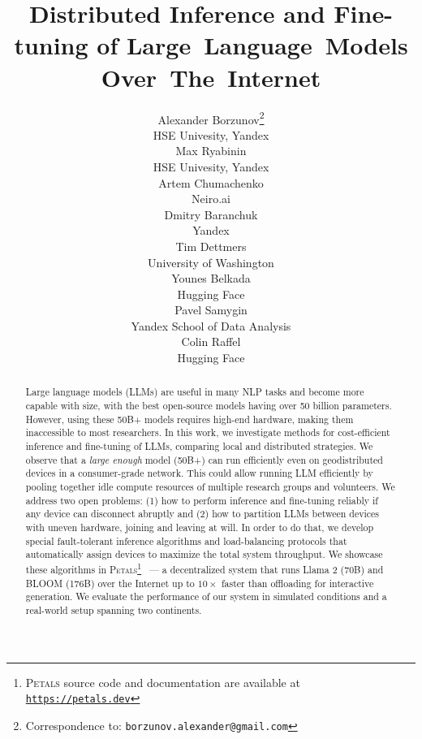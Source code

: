 \documentclass{article}
\title{Distributed Inference and Fine-tuning of Large~Language~Models Over~The~Internet}
\author{%
  Alexander Borzunov\thanks{Correspondence to: \texttt{borzunov.alexander@gmail.com}} \\
  HSE Univesity, Yandex \\
  \And
  Max Ryabinin \\
  HSE Univesity, Yandex \\
  \And
  Artem Chumachenko \\
  Neiro.ai \\
  \AND
  Dmitry Baranchuk \\
  Yandex \\
  \And
  Tim Dettmers \\
  University of Washington \\
  \And
  Younes Belkada \\
  Hugging Face \\
  \AND
  Pavel Samygin \\
  Yandex School of Data Analysis \\
  \And
  Colin Raffel \\
  Hugging Face
}
\begin{document}
\maketitle

\setcounter{footnote}{0}
\begin{abstract}

Large language models (LLMs) are useful in many NLP tasks and become more capable with size, with the best open-source models having over 50 billion parameters. 
However, using these 50B+ models requires high-end hardware, making them inaccessible to most researchers.
In this work, we investigate methods for cost-efficient inference and fine-tuning of LLMs, comparing local and distributed strategies. We observe that a \textit{large enough} model (50B+) can run efficiently even on geodistributed devices in a consumer-grade network.
This could allow running LLM efficiently by pooling together idle compute resources of multiple research groups and volunteers.
We address two open problems: (1) how to perform inference and fine-tuning reliably if any device can disconnect abruptly and (2) how to partition LLMs between devices with uneven hardware, joining and leaving at will.
In order to do that, we develop special fault-tolerant inference algorithms and load-balancing protocols that automatically assign devices to maximize the total system throughput.
We showcase these algorithms in \textsc{Petals}\footnote{\textsc{Petals} source code and documentation are available at \texttt{\href{https://petals.dev}{https://petals.dev}}}
~--- a decentralized system that runs Llama 2 (70B) and BLOOM (176B) over the Internet up to $10\times$ faster than offloading for interactive generation.
We evaluate the performance of our system in simulated conditions and a real-world setup spanning two continents.

\end{abstract}











\appendix


\end{document}
